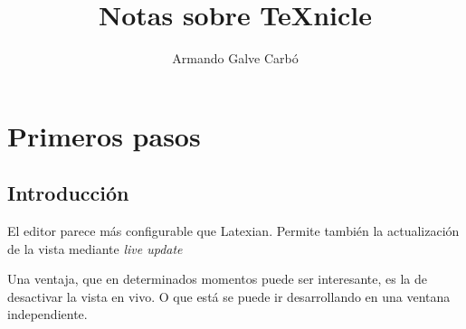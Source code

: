 \documentclass[11pt]{article}
\title{Notas sobre TeXnicle}
\author{Armando Galve Carbó}
\date{}
\begin{document}
\maketitle
\section{Primeros pasos}
\subsection{Introducción} El editor parece más configurable que Latexian. 
Permite también la actualización de la vista mediante \textit{live update}

Una ventaja, que en determinados momentos puede ser interesante, es la de 
desactivar la vista en vivo. O que está se puede ir desarrollando en una ventana 
independiente. 
\end{document}
